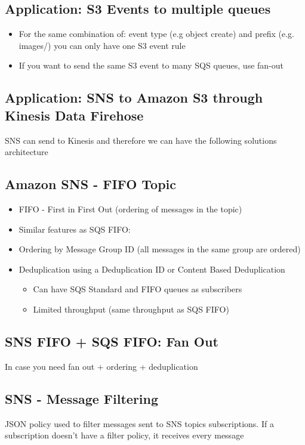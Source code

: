 \subsection{Application: S3 Events to multiple queues}
\begin{itemize}
    \item For the same combination of: event type (e.g object create) and prefix (e.g. images/) you can only have one S3 event rule
    \item If you want to send the same S3 event to many SQS queues, use fan-out
\end{itemize}

\subsection{Application: SNS to Amazon S3 through Kinesis Data Firehose}
SNS can send to Kinesis and therefore we can have the following solutions architecture

\subsection{Amazon SNS - FIFO Topic}
\begin{itemize}
    \item FIFO - First in First Out (ordering of messages in the topic)
    \item Similar features as SQS FIFO:
    \item Ordering by Message Group ID (all messages in the same group are ordered)
    \item Deduplication using a Deduplication ID or Content Based Deduplication
    \begin{itemize}
        \item Can have SQS Standard and FIFO queues as subscribers
        \item Limited throughput (same throughput as SQS FIFO)
    \end{itemize}
\end{itemize}

\subsection{SNS FIFO + SQS FIFO: Fan Out}
In case you need fan out + ordering + deduplication

\subsection{SNS - Message Filtering}
JSON policy used to filter messages sent to SNS topics subscriptions.
If a subscription doesn't have a filter policy, it receives every message


